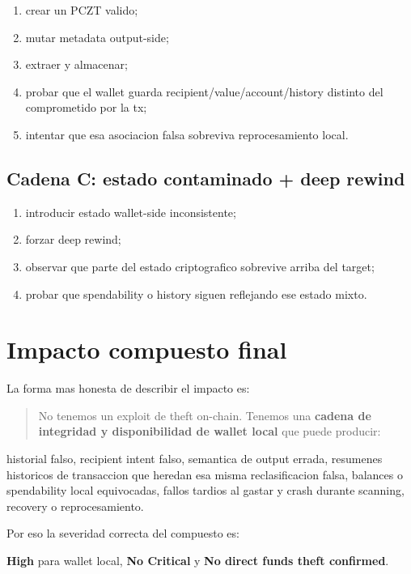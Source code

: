 \documentclass[11pt,a4paper]{article}
\begin{document}
\begin{enumerate}[leftmargin=2em]
    \item crear un PCZT valido;
    \item mutar metadata output-side;
    \item extraer y almacenar;
    \item probar que el wallet guarda recipient/value/account/history distinto
    del comprometido por la tx;
    \item intentar que esa asociacion falsa sobreviva reprocesamiento local.
\end{enumerate}

\subsection{Cadena C: estado contaminado + deep rewind}

\begin{enumerate}[leftmargin=2em]
    \item introducir estado wallet-side inconsistente;
    \item forzar deep rewind;
    \item observar que parte del estado criptografico sobrevive arriba del
    target;
    \item probar que spendability o history siguen reflejando ese estado mixto.
\end{enumerate}

\section{Impacto compuesto final}

La forma mas honesta de describir el impacto es:

\begin{quote}
No tenemos un exploit de theft on-chain. Tenemos una \textbf{cadena de
integridad y disponibilidad de wallet local} que puede producir:
\end{quote}

historial falso, recipient intent falso, semantica de output errada, resumenes
historicos de transaccion que heredan esa misma reclasificacion falsa,
balances o spendability local equivocadas, fallos tardios al gastar y crash
durante scanning, recovery o reprocesamiento.

Por eso la severidad correcta del compuesto es:

\textbf{High} para wallet local, \textbf{No Critical} y
\textbf{No direct funds theft confirmed}.
\end{document}
